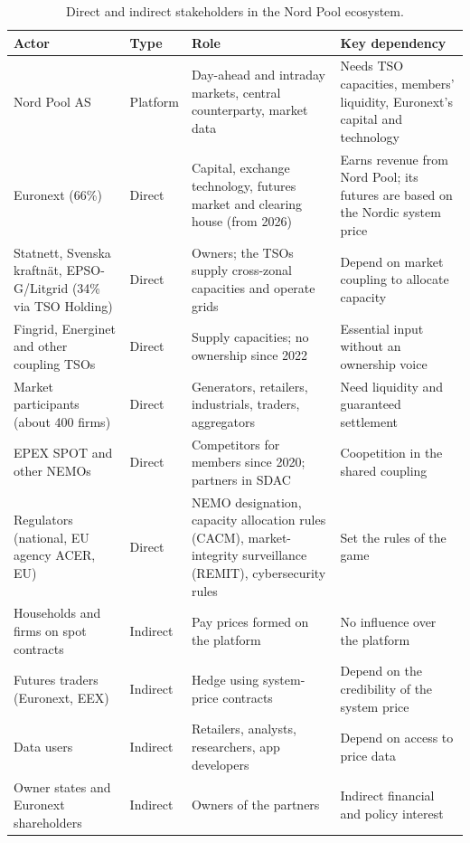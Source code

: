 \begin{table}[ht]
\centering
\small
\caption{Direct and indirect stakeholders in the Nord Pool ecosystem.}
\label{tab:stakeholders}
\begin{tabularx}{\textwidth}{L{3.3cm} L{1.4cm} Y Y}
\toprule
\textbf{Actor} & \textbf{Type} & \textbf{Role} & \textbf{Key dependency} \\
\midrule
Nord Pool AS & Platform & Day-ahead and intraday markets, central counterparty, market data & Needs TSO capacities, members' liquidity, Euronext's capital and technology \\
Euronext (66\%) & Direct & Capital, exchange technology, futures market and clearing house (from 2026) & Earns revenue from Nord Pool; its futures are based on the Nordic system price \\
Statnett, Svenska kraftnät, EPSO-G/Litgrid (34\% via TSO Holding) & Direct & Owners; the TSOs supply cross-zonal capacities and operate grids & Depend on market coupling to allocate capacity \\
Fingrid, Energinet and other coupling TSOs & Direct & Supply capacities; no ownership since 2022 & Essential input without an ownership voice \\
Market participants (about 400 firms) & Direct & Generators, retailers, industrials, traders, aggregators & Need liquidity and guaranteed settlement \\
EPEX SPOT and other NEMOs & Direct & Competitors for members since 2020; partners in SDAC & Coopetition in the shared coupling \\
Regulators (national, EU agency ACER, EU) & Direct & NEMO designation, capacity allocation rules (CACM), market-integrity surveillance (REMIT), cybersecurity rules & Set the rules of the game \\
Households and firms on spot contracts & Indirect & Pay prices formed on the platform & No influence over the platform \\
Futures traders (Euronext, EEX) & Indirect & Hedge using system-price contracts & Depend on the credibility of the system price \\
Data users & Indirect & Retailers, analysts, researchers, app developers & Depend on access to price data \\
Owner states and Euronext shareholders & Indirect & Owners of the partners & Indirect financial and policy interest \\
\bottomrule
\end{tabularx}
\end{table}

